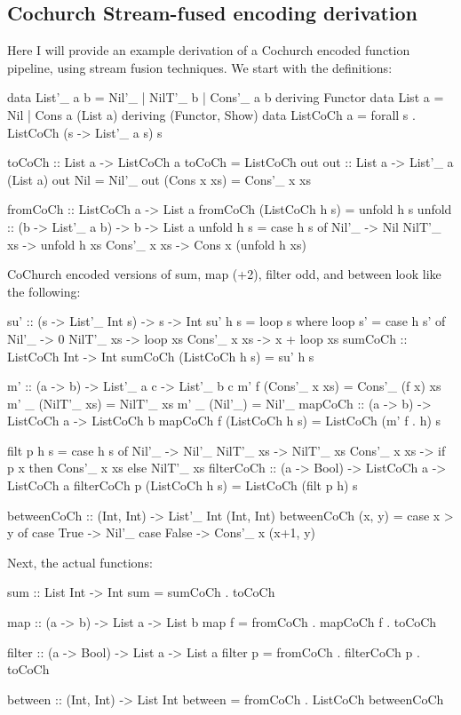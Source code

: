 
\subsection{Cochurch Stream-fused encoding derivation}\label{app:cochurch_stream}
Here I will provide an example derivation of a Cochurch encoded function pipeline, using stream fusion techniques.
We start with the definitions:
\begin{spec}
data List'_ a b = Nil'_ | NilT'_ b | Cons'_ a b deriving Functor
data List a = Nil | Cons a (List a) deriving (Functor, Show)
data ListCoCh a = forall s . ListCoCh (s -> List'_ a s) s

toCoCh :: List a -> ListCoCh a
toCoCh = ListCoCh out
out :: List a -> List'_ a (List a)
out Nil = Nil'_
out (Cons x xs) = Cons'_ x xs

fromCoCh :: ListCoCh a -> List a
fromCoCh (ListCoCh h s) = unfold h s
unfold :: (b -> List'_ a b) -> b -> List a
unfold h s = case h s of
  Nil'_ -> Nil
  NilT'_ xs -> unfold h xs
  Cons'_ x xs -> Cons x (unfold h xs)
\end{spec}
CoChurch encoded versions of sum, map (+2), filter odd, and between look like the following:
\begin{spec}
su' :: (s -> List'_ Int s) -> s -> Int
su' h s = loop s
  where loop s' = case h s' of
    Nil'_ -> 0
    NilT'_ xs -> loop xs
    Cons'_ x xs -> x + loop xs
sumCoCh :: ListCoCh Int -> Int
sumCoCh (ListCoCh h s) = su' h s

m' :: (a -> b) -> List'_ a c -> List'_ b c
m' f (Cons'_ x xs) = Cons'_ (f x) xs
m' _ (NilT'_ xs) = NilT'_ xs
m' _ (Nil'_) = Nil'_
mapCoCh :: (a -> b) -> ListCoCh a -> ListCoCh b
mapCoCh f (ListCoCh h s) = ListCoCh (m' f . h) s

filt p h s = case h s of
               Nil'_ -> Nil'_
               NilT'_ xs -> NilT'_ xs
               Cons'_ x xs -> if p x then Cons'_ x xs else NilT'_ xs
filterCoCh :: (a -> Bool) -> ListCoCh a -> ListCoCh a
filterCoCh p (ListCoCh h s) = ListCoCh (filt p h) s

betweenCoCh :: (Int, Int) -> List'_ Int (Int, Int)
betweenCoCh (x, y) = case x > y of
  case True -> Nil'_
  case False -> Cons'_ x (x+1, y)
\end{spec}
Next, the actual functions:
\begin{spec}
sum :: List Int -> Int
sum = sumCoCh . toCoCh

map :: (a -> b) -> List a -> List b
map f = fromCoCh . mapCoCh f . toCoCh

filter :: (a -> Bool) -> List a -> List a
filter p = fromCoCh . filterCoCh p . toCoCh

between :: (Int, Int) -> List Int
between = fromCoCh . ListCoCh betweenCoCh
\end{spec}
